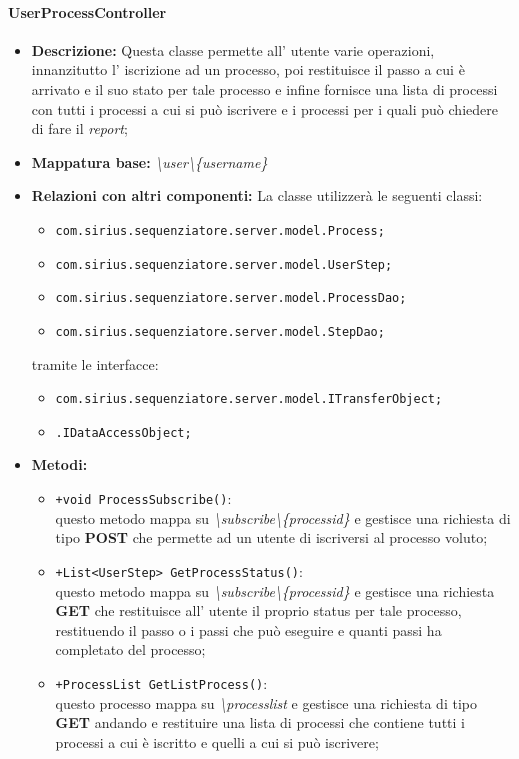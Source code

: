 \paragraph{UserProcessController}%
\begin{itemize}
	\item \textbf{Descrizione: } Questa classe permette all' utente varie operazioni, innanzitutto l' iscrizione ad un processo, poi restituisce il passo a cui è arrivato e il suo stato per tale processo e infine fornisce una lista di processi con tutti i processi a cui si può iscrivere e i processi per i quali può chiedere di fare il \textit{report};
	\item \textbf{Mappatura base: } \textit{\textbackslash user\textbackslash \{username\}}
	\item \textbf{Relazioni con altri componenti: }
	La classe utilizzerà le seguenti classi:
	\begin{itemize}
		\item \texttt{com.sirius.sequenziatore.server.model.Process;}
		\item \texttt{com.sirius.sequenziatore.server.model.UserStep;}
		\item \texttt{com.sirius.sequenziatore.server.model.ProcessDao;}
		\item \texttt{com.sirius.sequenziatore.server.model.StepDao;}
	\end{itemize}
	tramite le interfacce:
	\begin{itemize}
		\item \texttt{com.sirius.sequenziatore.server.model.ITransferObject;}
		\item \texttt{\sModel .IDataAccessObject;}
	\end{itemize}
	\item \textbf{Metodi: }\begin{itemize}
					\item \texttt{+void ProcessSubscribe()}:\\
					questo metodo mappa su \textit{\textbackslash subscribe\textbackslash \{processid\}} e gestisce una richiesta di tipo \textbf{POST} che permette ad un utente di iscriversi al processo voluto;
					\item \texttt{+List<UserStep> GetProcessStatus()}:\\
					questo metodo mappa su \textit{\textbackslash subscribe\textbackslash \{processid\}} e gestisce una richiesta \textbf{GET} che restituisce all' utente il proprio status per tale processo, restituendo il passo o i passi che può eseguire e quanti passi ha completato del processo;
					\item \texttt{+ProcessList GetListProcess()}:\\
					questo processo mappa su \textit{\textbackslash processlist} e gestisce una richiesta di tipo \textbf{GET} andando e restituire una lista di processi che contiene tutti i processi  a cui è iscritto e quelli a cui si può iscrivere;
				\end{itemize}
\end{itemize}
